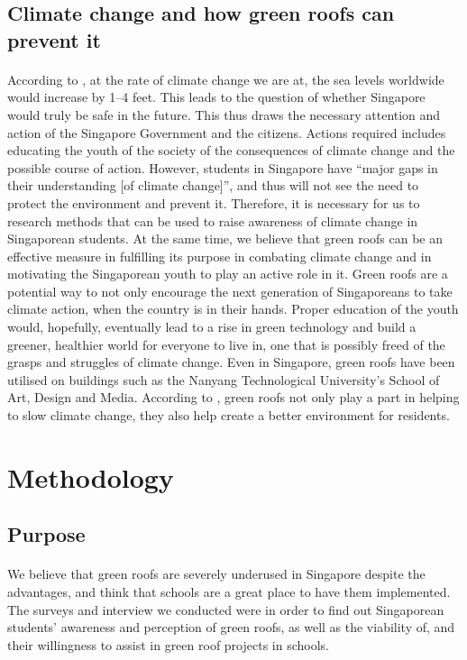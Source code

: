 \documentclass[a4paper]{article}
\begin{document}
\begin{multicols}{2}
  \subsection{Climate change and how green roofs can prevent it} \label{sec:grhelp}
  \paragraph{} According to \cite{nasa}, at the rate of climate
  change we are at, the sea levels worldwide would increase by 1--4
  feet. This leads to the question of whether Singapore would truly
  be safe in the future. This thus draws the necessary attention and
  action of the Singapore Government and the citizens. Actions required
  includes educating the youth of the society of the consequences of
  climate change and the possible course of action.  However, students
  in Singapore have ``major gaps in their understanding [of climate
  change]''\parencite{student_carbon_footprint}, and thus will not
  see the need to protect the environment and prevent it. Therefore,
  it is necessary for us to research methods that can be used to raise
  awareness of climate change in Singaporean students. At the same
  time, we believe that green roofs can be an effective measure in
  fulfilling its purpose in combating climate change and in motivating
  the Singaporean youth to play an active role in it. Green roofs are a
  potential way to not only encourage the next generation of Singaporeans
  to take climate action,  when the country is in their hands. Proper
  education of the youth would, hopefully, eventually lead to a rise in
  green technology and build a greener, healthier world for everyone
  to live in, one that is possibly freed of the grasps and struggles
  of climate change. Even in Singapore, green roofs have been utilised
  on buildings such as the Nanyang Technological University's School
  of Art, Design and Media. According to \cite{greenbuild_advant1},
  green roofs not only play a part in helping to slow climate change,
  they also help create a better environment for residents.




  \section{Methodology}
  \subsection{Purpose}
  \paragraph{} We believe that green roofs are severely underused
  in Singapore despite the advantages, and think that schools are a
  great place to have them implemented. The surveys and interview we
  conducted were in order to find out Singaporean students' awareness
  and perception of green roofs, as well as the viability of, and their
  willingness to assist in green roof projects in schools.


\end{multicols}
\end{document}
